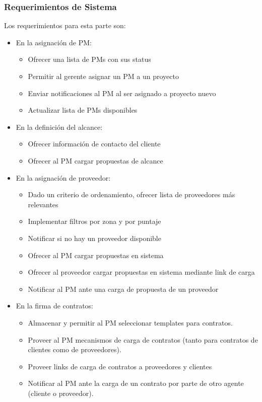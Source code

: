 \subsubsection{Requerimientos de Sistema}
Los requerimientos para esta parte son:
\begin{itemize}
	\item En la asignación de PM:
	\begin{itemize}
		\item Ofrecer una lista de PMs con sus status
		\item Permitir al gerente asignar un PM a un proyecto
		\item Enviar notificaciones al PM al ser asignado a proyecto nuevo
		\item Actualizar lista de PMs disponibles
	\end{itemize}
	\item En la definición del alcance:
	\begin{itemize}
		\item Ofrecer información de contacto del cliente
		\item Ofrecer al PM cargar propuestas de alcance
	\end{itemize}
	\item En la asignación de proveedor:
	\begin{itemize}
		\item Dado un criterio de ordenamiento, ofrecer lista de proveedores más relevantes
		\item Implementar filtros por zona y por puntaje
		\item Notificar si no hay un proveedor disponible
		\item Ofrecer al PM cargar propuestas en sistema
		\item Ofrecer al proveedor cargar propuestas en sistema mediante link de carga
		\item Notificar al PM ante una carga de propuesta de un proveedor
	\end{itemize}
	\item En la firma de contratos:
	\begin{itemize}
		\item Almacenar y permitir al PM seleccionar templates para contratos.
		\item Proveer al PM mecanismos de carga de contratos (tanto para contratos de clientes como de proveedores).
		\item Proveer links de carga de contratos a proveedores y clientes
		\item Notificar al PM ante la carga de un contrato por parte de otro agente (cliente o proveedor).
	\end{itemize}
\end{itemize}

